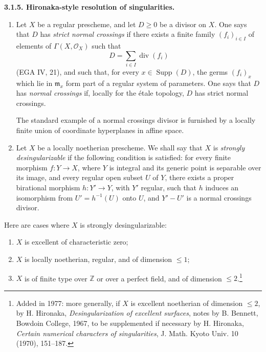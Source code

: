 \documentclass[11pt]{article}
\DeclareMathOperator{\Supp}{Supp}
\providecommand{\cO}{\mathcal{O}}
\providecommand{\fm}{\mathfrak{m}}
\providecommand{\ZZ}{\mathbb{Z}}
\newenvironment{statement}[1]{\par\medskip\noindent\textbf{#1.}\ }{\par\medskip}
\providecommand{\Supp}{\operatorname{Supp}}
\providecommand{\fm}{\mathfrak m}
\begin{document}
\begin{statement}{3.1.5. Hironaka-style resolution of singularities}
\begin{enumerate}[label=\alph*)]
\item Let $X$ be a regular prescheme, and let $D\ge0$ be a divisor on $X$. One says that $D$ has \emph{strict normal crossings} if there exists a finite family $(f_i)_{i\in I}$ of elements of $\Gamma(X,\cO_X)$ such that
\[
   D=\sum_{i\in I}\operatorname{div}(f_i)
\]
(EGA IV, 21), and such that, for every $x\in\Supp(D)$, the germs $(f_i)_x$ which lie in $\fm_x$ form part of a regular system of parameters. One says that $D$ has \emph{normal crossings} if, locally for the étale topology, $D$ has strict normal crossings.

The standard example of a normal crossings divisor is furnished by a locally finite union of coordinate hyperplanes in affine space.

\item Let $X$ be a locally noetherian prescheme. We shall say that $X$ is \emph{strongly desingularizable} if the following condition is satisfied: for every finite morphism $f:Y\to X$, where $Y$ is integral and its generic point is separable over its image, and every regular open subset $U$ of $Y$, there exists a proper birational morphism $h:Y'\to Y$, with $Y'$ regular, such that $h$ induces an isomorphism from $U'=h^{-1}(U)$ onto $U$, and $Y'-U'$ is a normal crossings divisor.
\end{enumerate}
Here are cases where $X$ is strongly desingularizable:
\begin{enumerate}[label=\alph*)]
\item $X$ is excellent of characteristic zero;
\item $X$ is locally noetherian, regular, and of dimension $\le1$;
\item $X$ is of finite type over $\ZZ$ or over a perfect field, and of dimension $\le2$.\footnote{Added in 1977: more generally, if $X$ is excellent noetherian of dimension $\le2$, by H. Hironaka, \emph{Desingularization of excellent surfaces}, notes by B. Bennett, Bowdoin College, 1967, to be supplemented if necessary by H. Hironaka, \emph{Certain numerical characters of singularities}, J. Math. Kyoto Univ. 10 (1970), 151--187.}
\end{enumerate}
\end{statement}
\end{document}
